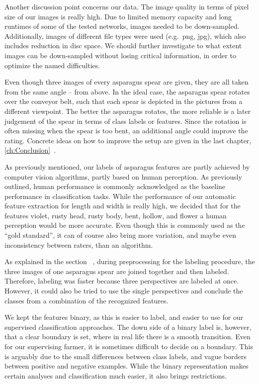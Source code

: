 Another discussion point concerns our data. The image quality in terms of pixel size of our images is really high. Due to limited memory capacity and long runtimes of some of the tested networks, images needed to be down-sampled. Additionally, images of different file types were used (e.g.\ png, jpg), which also includes reduction in disc space. We should further investigate to what extent images can be down-sampled without losing critical information, in order to optimize the named difficulties.

Even though three images of every asparagus spear are given, they are all taken from the same angle – from above. In the ideal case, the asparagus spear rotates over the conveyor belt, such that each spear is depicted in the pictures from a different viewpoint. The better the asparagus rotates, the more reliable is a later judgement of the spear in terms of class labels or features. Since the rotation is often missing when the spear is too bent, an additional angle could improve the rating. Concrete ideas on how to improve the setup are given in the last chapter, \ref{ch:Conclusion}~.

As previously mentioned, our labels of asparagus features are partly achieved by computer vision algorithms, partly based on human perception. As previously outlined, human performance is commonly acknowledged as the baseline performance in classification tasks. While the performance of our automatic feature extraction for length and width is really high, we decided that for the features violet, rusty head, rusty body, bent, hollow, and flower a human perception would be more accurate. Even though this is commonly used as the \enquote{gold standard}, it can of course also bring more variation, and maybe even inconsistency between raters, than an algorithm.

As explained in the section ~, during preprocessing for the labeling procedure, the three images of one asparagus spear are joined together and then labeled. Therefore, labeling was faster because three perspectives are labeled at once. However, it could also be tried to use the single perspectives and conclude the classes from a combination of the recognized features.

We kept the features binary, as this is easier to label, and easier to use for our supervised classification approaches. The down side of a binary label is, however, that a clear boundary is set, where in real life there is a smooth transition. Even for our supervising farmer, it is sometimes difficult to decide on a boundary. This is arguably due to the small differences between class labels, and vague borders between positive and negative examples. While the binary representation makes certain analyses and classification much easier, it also brings restrictions.

